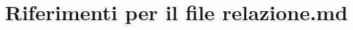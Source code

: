 \hypertarget{relazione_8md}{\section{Riferimenti per il file relazione.\+md}
\label{relazione_8md}
}
